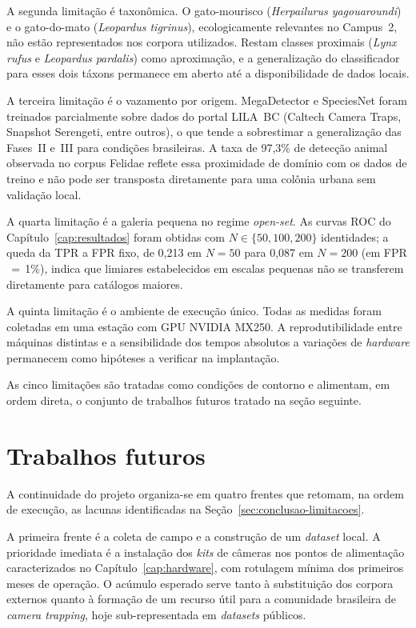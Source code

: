 A segunda limitação é taxonômica. O gato-mourisco (\textit{Herpailurus yagouaroundi}) e o gato-do-mato (\textit{Leopardus tigrinus}), ecologicamente relevantes no Campus~2, não estão representados nos corpora utilizados. Restam classes proximais (\textit{Lynx rufus} e \textit{Leopardus pardalis}) como aproximação, e a generalização do classificador para esses dois táxons permanece em aberto até a disponibilidade de dados locais.

A terceira limitação é o vazamento por origem. MegaDetector e SpeciesNet foram treinados parcialmente sobre dados do portal LILA~BC (Caltech Camera Traps, Snapshot Serengeti, entre outros), o que tende a sobrestimar a generalização das Fases~II e~III para condições brasileiras. A taxa de 97,3\% de detecção animal observada no corpus Felidae reflete essa proximidade de domínio com os dados de treino e não pode ser transposta diretamente para uma colônia urbana sem validação local.

A quarta limitação é a galeria pequena no regime \textit{open-set}. As curvas ROC do Capítulo~\ref{cap:resultados} foram obtidas com $N \in \{50, 100, 200\}$ identidades; a queda da TPR a FPR fixo, de 0,213 em $N{=}50$ para 0,087 em $N{=}200$ (em FPR$\,=\,$1\%), indica que limiares estabelecidos em escalas pequenas não se transferem diretamente para catálogos maiores.

A quinta limitação é o ambiente de execução único. Todas as medidas foram coletadas em uma estação com GPU NVIDIA MX250. A reprodutibilidade entre máquinas distintas e a sensibilidade dos tempos absolutos a variações de \textit{hardware} permanecem como hipóteses a verificar na implantação.

As cinco limitações são tratadas como condições de contorno e alimentam, em ordem direta, o conjunto de trabalhos futuros tratado na seção seguinte.


\section{Trabalhos futuros}
\label{sec:conclusao-futuros}

A continuidade do projeto organiza-se em quatro frentes que retomam, na ordem de execução, as lacunas identificadas na Seção~\ref{sec:conclusao-limitacoes}.

A primeira frente é a coleta de campo e a construção de um \textit{dataset} local. A prioridade imediata é a instalação dos \textit{kits} de câmeras nos pontos de alimentação caracterizados no Capítulo~\ref{cap:hardware}, com rotulagem mínima dos primeiros meses de operação. O acúmulo esperado serve tanto à substituição dos corpora externos quanto à formação de um recurso útil para a comunidade brasileira de \textit{camera trapping}, hoje sub-representada em \textit{datasets} públicos.

